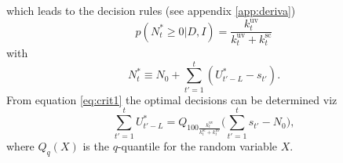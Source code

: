\documentclass[a4paper,12pt]{article}
\theoremstyle{definition}
\begin{document}
	which leads to the decision rules (see appendix \ref{app:deriva})
	\begin{equation}
		p(N_t^*\geq 0|D,I)=\frac{k_{t}^\text{uv}}{k_{t}^\text{uv}+k^\text{sc}_{t}}
		\label{eq:crit1}
	\end{equation}
	with
	\begin{equation}
		N_t^*\equiv N_0+\sum_{t'=1}^{t}(U_{t'-L}^*-s_{t'}).
	\end{equation}
	From equation \eqref{eq:crit1} the optimal decisions can be determined viz
	\begin{equation}
		\sum_{t'=1}^{t}U_{t'-L}^* = Q_{100\frac{k_{t}^\text{uv}}{k^\text{sc}_{t}+k_{t}^\text{uv}}}\bigg(\sum_{t'=1}^{t}s_{t'}-N_0\bigg),
	\end{equation}
	where $Q_q(X)$ is the $q$-quantile for the random variable $X$.


	
	\newpage
	\begin{appendices}
		
	\end{appendices}
	
	
	
	
	
	
\end{document}

